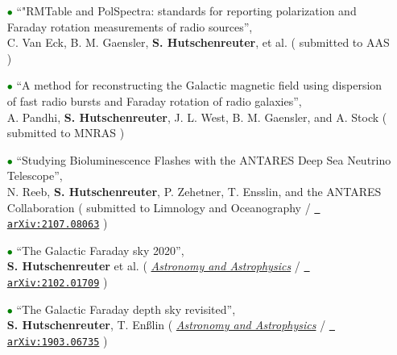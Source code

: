 \begin{itemize}

\item[\textcolor{Green}{$\bullet$}]{``"RMTable and PolSpectra: standards for reporting polarization and Faraday rotation measurements of radio sources'', \\  
C. Van Eck, B. M. Gaensler, \textbf{S. Hutschenreuter}, et al. ({\color{blue}  submitted to AAS} })

\vspace{6pt}


\item[\textcolor{Green}{$\bullet$}]{``A method for reconstructing the Galactic magnetic field using dispersion of fast radio bursts and Faraday rotation of radio galaxies'', \\  
A. Pandhi, \textbf{S. Hutschenreuter}, J. L. West, B. M. Gaensler, and A. Stock ({\color{blue} submitted to MNRAS} })

\vspace{6pt}

\item[\textcolor{Green}{$\bullet$}]{``Studying Bioluminescence Flashes with the ANTARES Deep Sea Neutrino Telescope'', \\  
N. Reeb, \textbf{S. Hutschenreuter}, P. Zehetner, T. Ensslin, and the ANTARES Collaboration ({\color{blue} submitted to Limnology and Oceanography / \href{https://arxiv.org/abs/2107.08063}{\texttt{{\color{blue} arXiv:2107.08063}}}} })

\vspace{6pt}

\item[\textcolor{Green}{$\bullet$}]{``The Galactic Faraday sky 2020'', \\  
\textbf{S. Hutschenreuter} et al. ({\color{blue} \href{https://www.aanda.org/articles/aa/abs/2022/01/aa40486-21/aa40486-21.htmll}{\textit{Astronomy and Astrophysics}} /  \href{https://arxiv.org/abs/2102.01709}{\texttt{{\color{blue} arXiv:2102.01709}}}} })

\vspace{6pt}

\item[\textcolor{Green}{$\bullet$}]{``The Galactic Faraday depth sky revisited'', \\  
\textbf{S. Hutschenreuter}, T. En{\ss}lin ({\color{blue} \href{https://www.aanda.org/articles/aa/full_html/2020/01/aa35479-19/aa35479-19.html}{\textit{Astronomy and Astrophysics}} /  \href{https://arxiv.org/abs/1903.06735}{\texttt{{\color{blue} arXiv:1903.06735}}}} })


\end{itemize}
